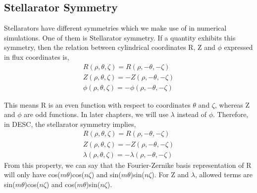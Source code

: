 \subsection{Stellarator Symmetry}

Stellarators have different symmetries which we make use of in numerical simulations. One of them is Stellarator symmetry. If a quantity exhibits this symmetry, then the relation between cylindrical coordinates R, Z and $\phi$ expressed in flux coordinates is,
\begin{align}
    R(\rho, \theta, \zeta) = R(\rho, -\theta, -\zeta) \\
    Z(\rho, \theta, \zeta) = - Z(\rho, -\theta, -\zeta) \\
    \phi(\rho, \theta, \zeta) = - \phi(\rho, -\theta, -\zeta)
\end{align}

This means R is an even function with respect to coordinates $\theta$ and $\zeta$, whereas Z and $\phi$ are odd functions. In later chapters, we will use $\lambda$ instead of $\phi$. Therefore, in DESC, the stellarator symmetry implies,
\begin{align}
    R(\rho, \theta, \zeta) = R(\rho, -\theta, -\zeta) \\
    Z(\rho, \theta, \zeta) = - Z(\rho, -\theta, -\zeta) \\
    \lambda(\rho, \theta, \zeta) = - \lambda(\rho, -\theta, -\zeta)
\end{align}
From this property, we can say that the Fourier-Zernike basis representation of R will only have cos($m\theta$)cos($n\zeta$) and sin($m\theta$)sin($n\zeta$). For Z and $\lambda$, allowed terms are sin($m\theta$)cos($n\zeta$) and cos($m\theta$)sin($n\zeta$).

